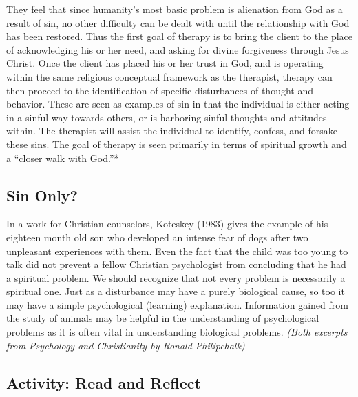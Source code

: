 \documentclass[
]{book}
\begin{document}
They feel that since humanity's most basic problem is alienation from God as a result of sin, no other difficulty can be dealt with until the relationship with God has been restored. Thus the first goal of therapy is to bring the client to the place of acknowledging his or her need, and asking for divine forgiveness through Jesus Christ. Once the client has placed his or her trust in God, and is operating within the same religious conceptual framework as the therapist, therapy can then proceed to the identification of specific disturbances of thought and behavior. These are seen as examples of sin in that the individual is either acting in a sinful way towards others, or is harboring sinful thoughts and attitudes within. The therapist will assist the individual to identify, confess, and forsake these sins. The goal of therapy is seen primarily in terms of spiritual growth and a ``closer walk with God.''*

\hypertarget{sin-only}{%
\subsection*{Sin Only?}\label{sin-only}}

In a work for Christian counselors, Koteskey (1983) gives the example of his eighteen month old son who developed an intense fear of dogs after two unpleasant experiences with them. Even the fact that the child was too young to talk did not prevent a fellow Christian psychologist from concluding that he had a spiritual problem. We should recognize that not every problem is necessarily a spiritual one. Just as a disturbance may have a purely biological cause, so too it may have a simple psychological (learning) explanation. Information gained from the study of animals may be helpful in the understanding of psychological problems as it is often vital in understanding biological problems. \emph{(Both excerpts from Psychology and Christianity by Ronald Philipchalk)}

\hypertarget{activity-read-and-reflect-20}{%
\subsection*{Activity: Read and Reflect}\label{activity-read-and-reflect-20}}
\end{document}
